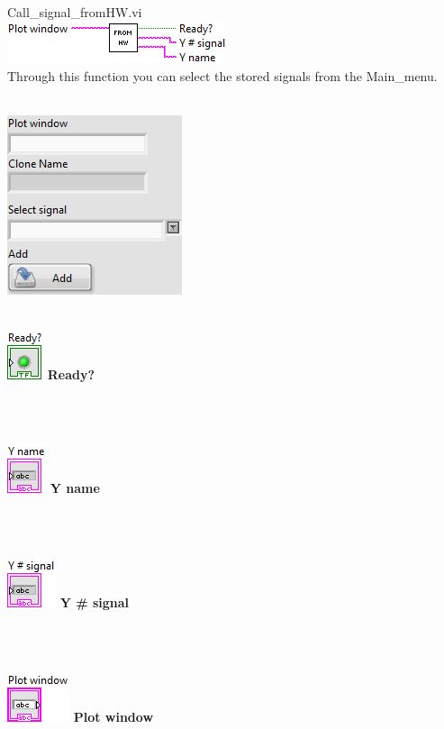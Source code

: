 \documentclass[
]{article}
\begin{document}
\hfill\break
Call\_signal\_fromHW.vi\\
\includegraphics{LVtemp20240312184738_7_0c.png}\\
Through this function you can select the stored signals from the
Main\_menu.\\
\strut \\
\includegraphics{LVtemp20240312184738_8_0.png}\\
\strut \\
\includegraphics{LVtemp20240312184738_9_0.png} \textbf{Ready?\\
}\strut \\
\strut \\
\includegraphics{LVtemp20240312184738_10_0.png} \textbf{Y name\\
}\strut \\
\strut \\
\includegraphics{LVtemp20240312184738_11_0.png} \textbf{Y \# signal\\
}\strut \\
\strut \\
\includegraphics{LVtemp20240312184738_12_0.png} \textbf{Plot window\\
}\strut \\
\strut \\
\end{document}
